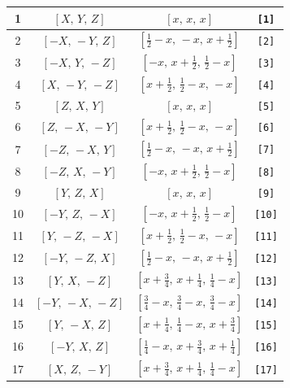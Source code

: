 \documentclass[fleqn,8pt]{jsarticle}
\begin{document}
\begin{longtable}{cccc}
1 & $\left[ X,\, Y,\, Z \right]$ & $\left[ x,\, x,\, x \right]$ & {\tt [1]} \\ \hline
2 & $\left[ - X,\, - Y,\, Z \right]$ & $\left[ \frac{1}{2} - x,\, - x,\, x + \frac{1}{2} \right]$ & {\tt [2]} \\ \hline
3 & $\left[ - X,\, Y,\, - Z \right]$ & $\left[ - x,\, x + \frac{1}{2},\, \frac{1}{2} - x \right]$ & {\tt [3]} \\ \hline
4 & $\left[ X,\, - Y,\, - Z \right]$ & $\left[ x + \frac{1}{2},\, \frac{1}{2} - x,\, - x \right]$ & {\tt [4]} \\ \hline
5 & $\left[ Z,\, X,\, Y \right]$ & $\left[ x,\, x,\, x \right]$ & {\tt [5]} \\ \hline
6 & $\left[ Z,\, - X,\, - Y \right]$ & $\left[ x + \frac{1}{2},\, \frac{1}{2} - x,\, - x \right]$ & {\tt [6]} \\ \hline
7 & $\left[ - Z,\, - X,\, Y \right]$ & $\left[ \frac{1}{2} - x,\, - x,\, x + \frac{1}{2} \right]$ & {\tt [7]} \\ \hline
8 & $\left[ - Z,\, X,\, - Y \right]$ & $\left[ - x,\, x + \frac{1}{2},\, \frac{1}{2} - x \right]$ & {\tt [8]} \\ \hline
9 & $\left[ Y,\, Z,\, X \right]$ & $\left[ x,\, x,\, x \right]$ & {\tt [9]} \\ \hline
10 & $\left[ - Y,\, Z,\, - X \right]$ & $\left[ - x,\, x + \frac{1}{2},\, \frac{1}{2} - x \right]$ & {\tt [10]} \\ \hline
11 & $\left[ Y,\, - Z,\, - X \right]$ & $\left[ x + \frac{1}{2},\, \frac{1}{2} - x,\, - x \right]$ & {\tt [11]} \\ \hline
12 & $\left[ - Y,\, - Z,\, X \right]$ & $\left[ \frac{1}{2} - x,\, - x,\, x + \frac{1}{2} \right]$ & {\tt [12]} \\ \hline
13 & $\left[ Y,\, X,\, - Z \right]$ & $\left[ x + \frac{3}{4},\, x + \frac{1}{4},\, \frac{1}{4} - x \right]$ & {\tt [13]} \\ \hline
14 & $\left[ - Y,\, - X,\, - Z \right]$ & $\left[ \frac{3}{4} - x,\, \frac{3}{4} - x,\, \frac{3}{4} - x \right]$ & {\tt [14]} \\ \hline
15 & $\left[ Y,\, - X,\, Z \right]$ & $\left[ x + \frac{1}{4},\, \frac{1}{4} - x,\, x + \frac{3}{4} \right]$ & {\tt [15]} \\ \hline
16 & $\left[ - Y,\, X,\, Z \right]$ & $\left[ \frac{1}{4} - x,\, x + \frac{3}{4},\, x + \frac{1}{4} \right]$ & {\tt [16]} \\ \hline
17 & $\left[ X,\, Z,\, - Y \right]$ & $\left[ x + \frac{3}{4},\, x + \frac{1}{4},\, \frac{1}{4} - x \right]$ & {\tt [17]} \\ \hline

\end{longtable}
\end{document}
